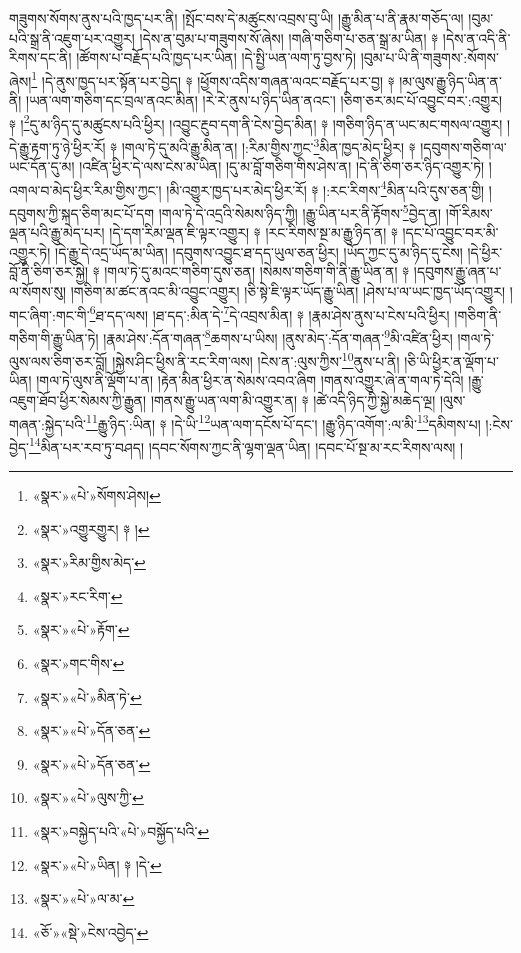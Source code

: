 གཟུགས་སོགས་ནུས་པའི་ཁྱད་པར་ནི། །སྤོང་བས་དེ་མཚུངས་འབྲས་བུ་ཡི། །རྒྱུ་མིན་པ་ནི་རྣམ་གཅོད་ལ། །བུམ་པའི་སྒྲ་ནི་འཇུག་པར་འགྱུར། །དེས་ན་བུམ་པ་གཟུགས་སོ་ཞེས། །གཞི་གཅིག་པ་ཅན་སྒྲ་མ་ཡིན། ༈ །དེས་ན་འདི་ནི་རིགས་དང་ནི། །ཚོགས་པ་བརྗོད་པའི་ཁྱད་པར་ཡིན། །དེ་སྤྱི་ཡན་ལག་ཏུ་བྱས་ཏེ། །བུམ་པ་ཡི་ནི་གཟུགས་:སོགས་ཞེས།\footnote{«སྣར་»«པེ་»སོགས་ཤེས།} །དེ་ནུས་ཁྱད་པར་སྟོན་པར་བྱེད། ༈ །ཕྱོགས་འདིས་གཞན་ལའང་བརྗོད་པར་བྱ། ༈ །མ་ལུས་རྒྱུ་ཉིད་ཡིན་ན་ནི། །ཡན་ལག་གཅིག་དང་བྲལ་ནའང་མིན། །རེ་རེ་ནུས་པ་ཉིད་ཡིན་ནའང་། །ཅིག་ཅར་མང་པོ་འབྱུང་བར་:འགྱུར། ༈ །\footnote{«སྣར་»འགྱུརགྱུར། ༈ །}དུ་མ་ཉིད་དུ་མཚུངས་པའི་ཕྱིར། །འབྱུང་རྔུབ་དག་ནི་ངེས་བྱེད་མིན། ༈ །གཅིག་ཉིད་ན་ཡང་མང་གསལ་འགྱུར། །དེ་རྒྱུ་རྟག་ཏུ་ཉེ་ཕྱིར་རོ། ༈ །གལ་ཏེ་དུ་མའི་རྒྱུ་མིན་ན། །:རིམ་གྱིས་ཀྱང་\footnote{«སྣར་»རིམ་གྱིས་མེད་}མིན་ཁྱད་མེད་ཕྱིར། ༈ །དབུགས་གཅིག་ལ་ཡང་དོན་དུ་མ། །འཛིན་ཕྱིར་དེ་ལས་ངེས་མ་ཡིན། །དུ་མ་བློ་གཅིག་གིས་ཤེས་ན། །དེ་ནི་ཅིག་ཅར་ཉིད་འགྱུར་ཏེ། །འགལ་བ་མེད་ཕྱིར་རིམ་གྱིས་ཀྱང་། །མི་འགྱུར་ཁྱད་པར་མེད་ཕྱིར་རོ། ༈ །:རང་རིགས་\footnote{«སྣར་»རང་རིག་}མིན་པའི་དུས་ཅན་གྱི། །དབུགས་ཀྱི་སྐད་ཅིག་མང་པོ་དག །གལ་ཏེ་དེ་འདྲའི་སེམས་ཉིད་ཀྱི། །རྒྱུ་ཡིན་པར་ནི་རྟོགས་\footnote{«སྣར་»«པེ་»རྟོག་}བྱེད་ན། །གོ་རིམས་ལྡན་པའི་རྒྱུ་མེད་པར། །དེ་དག་རིམ་ལྡན་ཇི་ལྟར་འགྱུར། ༈ །རང་རིགས་སྔ་མ་རྒྱུ་ཉིད་ན། ༈ །དང་པོ་འབྱུང་བར་མི་འགྱུར་ཏེ། །དེ་རྒྱུ་དེ་འདྲ་ཡོད་མ་ཡིན། །དབུགས་འབྱུང་ཐ་དད་ཡུལ་ཅན་ཕྱིར། །ཡོད་ཀྱང་དུ་མ་ཉིད་དུ་ངེས། །དེ་ཕྱིར་བློ་ནི་ཅིག་ཅར་སྐྱེ། ༈ །གལ་ཏེ་དུ་མའང་གཅིག་དུས་ཅན། །སེམས་གཅིག་གི་ནི་རྒྱུ་ཡིན་ན། ༈ །དབུགས་རྒྱུ་ཞན་པ་ལ་སོགས་སུ། །གཅིག་མ་ཚང་ནའང་མི་འབྱུང་འགྱུར། །ཅི་སྟེ་ཇི་ལྟར་ཡོད་རྒྱུ་ཡིན། །ཤེས་པ་ལ་ཡང་ཁྱད་ཡོད་འགྱུར། །གང་ཞིག་:གང་གི་\footnote{«སྣར་»གང་གིས་}ཐ་དད་ལས། །ཐ་དད་:མིན་དེ་\footnote{«སྣར་»«པེ་»མིན་ཏེ་}དེ་འབྲས་མིན། ༈ །རྣམ་ཤེས་ནུས་པ་ངེས་པའི་ཕྱིར། །གཅིག་ནི་གཅིག་གི་རྒྱུ་ཡིན་ཏེ། །རྣམ་ཤེས་:དོན་གཞན་\footnote{«སྣར་»«པེ་»དོན་ཅན་}ཆགས་པ་ཡིས། །ནུས་མེད་:དོན་གཞན་\footnote{«སྣར་»«པེ་»དོན་ཅན་}མི་འཛིན་ཕྱིར། །གལ་ཏེ་ལུས་ལས་ཅིག་ཅར་བློ། །སྐྱེས་ཤིང་ཕྱིས་ནི་རང་རིག་ལས། །ངེས་ན་:ལུས་ཀྱིས་\footnote{«སྣར་»«པེ་»ལུས་ཀྱི་}ནུས་པ་ནི། །ཅི་ཡི་ཕྱིར་ན་ལྡོག་པ་ཡིན། །གལ་ཏེ་ལུས་ནི་ལྡོག་པ་ན། །རྟེན་མིན་ཕྱིར་ན་སེམས་འབའ་ཞིག །གནས་འགྱུར་ཞེ་ན་གལ་ཏེ་དེའི། །རྒྱུ་འཇུག་ཐོབ་ཕྱིར་སེམས་ཀྱི་རྒྱུན། །གནས་རྒྱུ་ཡན་ལག་མི་འགྱུར་ན། ༈ །ཚེ་འདི་ཉིད་ཀྱི་སྐྱེ་མཆེད་ལྔ། །ལུས་གཞན་:སྐྱེད་པའི་\footnote{«སྣར་»བསྐྱེད་པའི་«པེ་»བསྐྱོད་པའི་}རྒྱུ་ཉིད་:ཡིན། ༈ །དེ་ཡི་\footnote{«སྣར་»«པེ་»ཡིན། ༈ །དེ་}ཡན་ལག་དངོས་པོ་དང་། །རྒྱུ་ཉིད་འགོག་:ལ་མི་\footnote{«སྣར་»«པེ་»ལ་མ་}དམིགས་པ། །:ངེས་བྱེད་\footnote{«ཅོ་»«སྡེ་»ངེས་འབྱེད་}མིན་པར་རབ་ཏུ་བཤད། །དབང་སོགས་ཀྱང་ནི་ལྷག་ལྡན་ཡིན། །དབང་པོ་སྔ་མ་རང་རིགས་ལས། །
